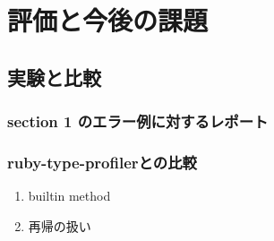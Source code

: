 \section{評価と今後の課題}

\subsection{実験と比較}


\subsubsection{section 1 のエラー例に対するレポート}


\subsubsection{ruby-type-profilerとの比較}

\begin{enumerate}
  \item builtin method
  \item 再帰の扱い
\end{enumerate}
